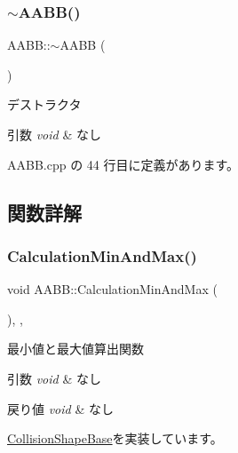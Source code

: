 \subsubsection{\texorpdfstring{$\sim$\+A\+A\+B\+B()}{~AABB()}}
{\footnotesize\ttfamily A\+A\+B\+B\+::$\sim$\+A\+A\+BB (\begin{DoxyParamCaption}{ }\end{DoxyParamCaption})}



デストラクタ 


\begin{DoxyParams}{引数}
{\em void} & なし \\
\hline
\end{DoxyParams}


 A\+A\+B\+B.\+cpp の 44 行目に定義があります。



\subsection{関数詳解}
\mbox{\label{class_a_a_b_b_a9f2f03e02053b4f170fc030bdc4ba6b6}} 
\subsubsection{\texorpdfstring{Calculation\+Min\+And\+Max()}{CalculationMinAndMax()}}
{\footnotesize\ttfamily void A\+A\+B\+B\+::\+Calculation\+Min\+And\+Max (\begin{DoxyParamCaption}{ }\end{DoxyParamCaption})\hspace{0.3cm}{\ttfamily [override]}, {\ttfamily [private]}, {\ttfamily [virtual]}}



最小値と最大値算出関数 


\begin{DoxyParams}{引数}
{\em void} & なし \\
\hline
\end{DoxyParams}

\begin{DoxyRetVals}{戻り値}
{\em void} & なし \\
\hline
\end{DoxyRetVals}


\mbox{\hyperlink{class_collision_shape_base_ad227c2f83038d7c05bc6b1d510cb4000}{Collision\+Shape\+Base}}を実装しています。



